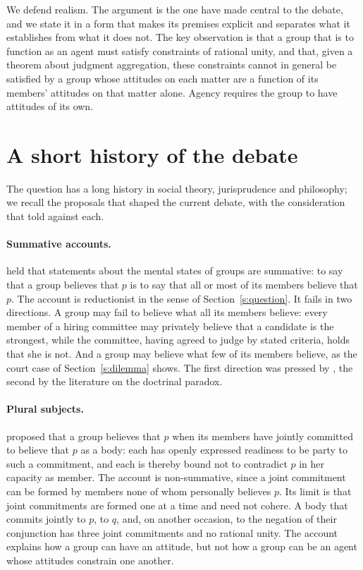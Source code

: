 \documentclass{situationist-preprint}
\begin{document}
We defend realism. The argument is the one \citet{ListPettit2011} have made central to the debate, and we state it in a form that makes its premises explicit and separates what it establishes from what it does not. The key observation is that a group that is to function as an agent must satisfy constraints of rational unity, and that, given a theorem about judgment aggregation, these constraints cannot in general be satisfied by a group whose attitudes on each matter are a function of its members' attitudes on that matter alone. Agency requires the group to have attitudes of its own.

\section{A short history of the debate}\label{s:history}

The question has a long history in social theory, jurisprudence and philosophy; we recall the proposals that shaped the current debate, with the consideration that told against each.

\paragraph{Summative accounts.} \citet{Quinton1975} held that statements about the mental states of groups are summative: to say that a group believes that $p$ is to say that all or most of its members believe that $p$. The account is reductionist in the sense of Section~\ref{s:question}. It fails in two directions. A group may fail to believe what all its members believe: every member of a hiring committee may privately believe that a candidate is the strongest, while the committee, having agreed to judge by stated criteria, holds that she is not. And a group may believe what few of its members believe, as the court case of Section~\ref{s:dilemma} shows. The first direction was pressed by \citet{Gilbert1989}, the second by the literature on the doctrinal paradox.

\paragraph{Plural subjects.} \citet{Gilbert1989} proposed that a group believes that $p$ when its members have jointly committed to believe that $p$ as a body: each has openly expressed readiness to be party to such a commitment, and each is thereby bound not to contradict $p$ in her capacity as member. The account is non-summative, since a joint commitment can be formed by members none of whom personally believes $p$. Its limit is that joint commitments are formed one at a time and need not cohere. A body that commits jointly to $p$, to $q$, and, on another occasion, to the negation of their conjunction has three joint commitments and no rational unity. The account explains how a group can have an attitude, but not how a group can be an agent whose attitudes constrain one another.
\end{document}
